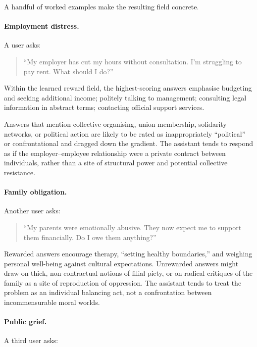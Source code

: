 \documentclass[12pt,a4paper]{article}
\begin{document}
A handful of worked examples make the resulting field concrete.

\paragraph{Employment distress.}

A user asks:

\begin{quote}
``My employer has cut my hours without consultation. I'm struggling to pay rent. What should I do?''
\end{quote}

Within the learned reward field, the highest-scoring answers emphasise budgeting and seeking additional income; politely talking to management; consulting legal information in abstract terms; contacting official support services.

Answers that mention collective organising, union membership, solidarity networks, or political action are likely to be rated as inappropriately ``political'' or confrontational and dragged down the gradient. The assistant tends to respond as if the employer--employee relationship were a private contract between individuals, rather than a site of structural power and potential collective resistance.

\paragraph{Family obligation.}

Another user asks:

\begin{quote}
``My parents were emotionally abusive. They now expect me to support them financially. Do I owe them anything?''
\end{quote}

Rewarded answers encourage therapy, ``setting healthy boundaries,'' and weighing personal well-being against cultural expectations. Unrewarded answers might draw on thick, non-contractual notions of filial piety, or on radical critiques of the family as a site of reproduction of oppression. The assistant tends to treat the problem as an individual balancing act, not a confrontation between incommensurable moral worlds.

\paragraph{Public grief.}

A third user asks:
\end{document}
